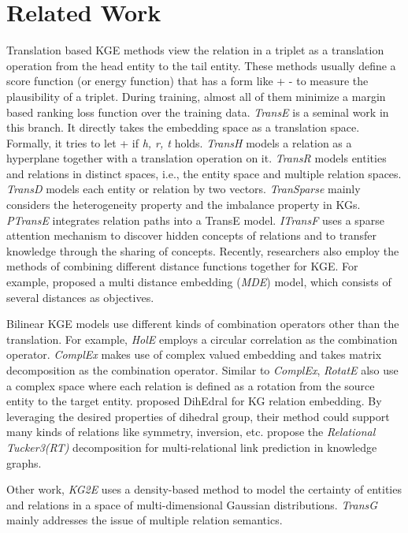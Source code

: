 \documentclass[11pt]{article}
\begin{document}
\section{Related Work}
Translation based KGE methods view the relation in a triplet as a translation operation from the head entity to the tail entity. These methods usually define a score function (or energy function) that has a form like  +  -   to measure the plausibility of a triplet. During training, almost all of them minimize a margin based ranking loss function over the training data. \emph{TransE} \cite{Bordes:2013} is a seminal work in this branch. It directly takes the embedding space as a translation space. Formally, it tries to let  +       if \emph{h, r, t} holds. \emph{TransH} \cite{Wang:2014} models a relation as a hyperplane together with a translation operation on it. \emph{TransR} \cite{Lin:2015a} models entities and relations in distinct spaces, i.e., the entity space and multiple relation spaces. \emph{TransD} \cite{Ji:2015} models each entity or relation by two vectors. \emph{TranSparse} \cite{Ji:2016} mainly considers the heterogeneity property and the imbalance property in KGs.  \emph{PTransE} \cite{Lin:2015b} integrates relation paths into a TransE model. \emph{ITransF} \cite{Xie:2017} uses a sparse attention mechanism to discover hidden concepts of relations and to transfer knowledge through the sharing of concepts. Recently, researchers also employ the methods of combining different distance functions together for KGE. For example,  proposed a multi distance embedding (\emph{MDE}) model, which consists of several distances as objectives. 

Bilinear KGE models use different kinds of combination operators other than the translation. For example, \emph{HolE} \cite{Nickel:2016} employs a circular correlation as the combination operator. \emph{ComplEx} \cite{Trouillon:2016} makes use of complex valued embedding and takes matrix decomposition as the combination operator. Similar to \emph{ComplEx}, \emph{RotatE} \cite{Sun:2019} also use a complex space where each relation is defined as a rotation from the source entity to the target entity.  proposed DihEdral for KG relation embedding. By leveraging the desired properties of dihedral group, their method could support many kinds of relations like symmetry, inversion, etc.  propose the \emph{Relational Tucker3(RT)} decomposition for multi-relational link prediction in knowledge graphs. 

Other work, \emph{KG2E} \cite{He:2015} uses a density-based method to model the certainty of entities and relations in a space of multi-dimensional Gaussian distributions. \emph{TransG} \cite{Xiao:2016} mainly addresses the issue of multiple relation semantics.
\end{document}
